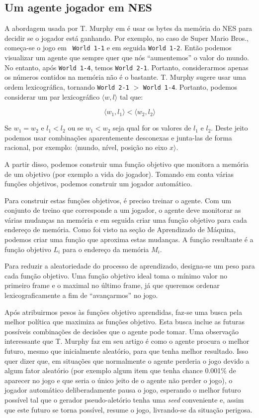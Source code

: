 \documentclass[a4paper,10pt]{article}
\theoremstyle{plain}
\begin{document}
\subsection{Um agente jogador em NES}

A abordagem usada por T. Murphy em \cite{dr-murphy} é usar os bytes da memória do NES para decidir
se o jogador está ganhando. Por exemplo, no caso de Super Mario Bros., começa-se o jogo em \texttt{
World 1-1} e em seguida \texttt{World 1-2}. Então podemos visualizar um agente que sempre quer que
nós ``aumentemos'' o valor do mundo. No entanto, após \texttt{World 1-4}, temos \texttt{World
2-1}. Portanto, considerarmos apenas os números contidos na memória não é o bastante. T. Murphy
sugere usar uma ordem lexicográfica, tornando \texttt{World 2-1} $>$ \texttt{World 1-4}. Portanto,
podemos considerar um par lexicográfico $\langle w, l \rangle$ tal que:

\begin{equation*}
  \langle w_1, l_1 \rangle < \langle w_2, l_2 \rangle
\end{equation*}

Se $w_1=w_2$ e $l_1<l_2$ ou se $w_1<w_2$ seja qual for os valores de $l_1$ e $l_2$. Deste jeito
podemos usar combinações aparentemente desconexas e junta-las de forma racional, por exemplo:
$\langle$mundo, nível, posição no eixo $x\rangle$.

A partir disso, podemos construir uma função objetivo que monitora a memória de um objetivo (por
exemplo a vida do jogador). Tomando em conta várias funções objetivos, podemos construir um jogador
automático.

Para construir estas funções objetivos, é preciso treinar o agente. Com um conjunto de treino que
corresponde a um jogador, o agente deve monitorar as várias mudanças na memória e em seguida criar
uma função objetivo para cada endereço de memória. Como foi visto na seção de Aprendizado de
Máquina, podemos criar uma função que aproxima estas mudanças. A função resultante é a função
objetivo $L_i$ para o endereço da memória $M_i$.

Para reduzir a aleatoriedade do processo de aprendizado, designa-se um peso para cada função
objetivo. Uma função objetivo ideal toma o mínimo valor no primeiro frame e o maximal no último
frame, já que queremos ordenar lexicograficamente a fim de ``avançarmos'' no jogo.

Após atribuirmos pesos às funções objetivo aprendidas, faz-se uma busca pela melhor política que
maximiza as funções objetivo. Esta busca inclue as futuras possíveis combinações de decisões que
o agente pode tomar. Uma observação interessante que T. Murphy faz em seu artigo é como o agente
procura o melhor futuro, mesmo que inicialmente aleatório, para que tenha melhor resultado. Isso
quer dizer que, em situações que normalmente o agente perderia o jogo devido a algum fator
aleatório (por exemplo algum item que tenha chance 0.001\% de aparecer no jogo e que seria o único
jeito de o agente não perder o jogo), o jogador automático deliberadamente pausa o jogo, esperando
o melhor futuro possível tal que o gerador pseudo-aletório tenha uma \textit{seed} conveniente e,
assim que este futuro se torna possível, resume o jogo, livrando-se da situação perigosa.
\end{document}
